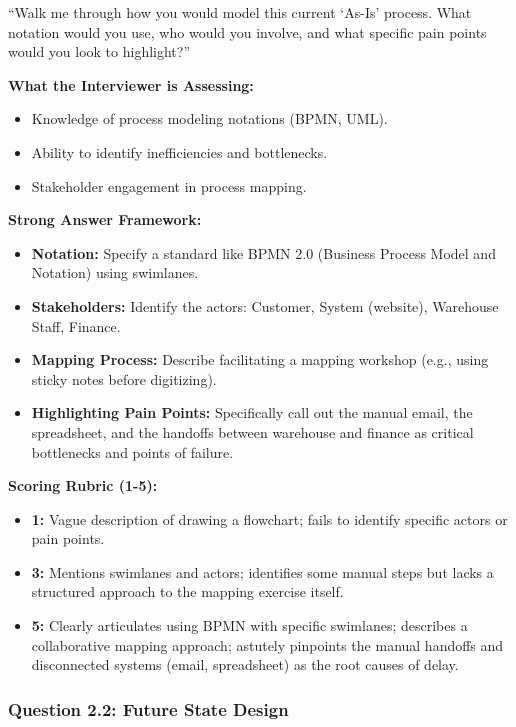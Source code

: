 ``Walk me through how you would model this current `As-Is' process. What
notation would you use, who would you involve, and what specific pain
points would you look to highlight?''

\textbf{What the Interviewer is Assessing:}

\begin{itemize}
\tightlist
\item
  Knowledge of process modeling notations (BPMN, UML).
\item
  Ability to identify inefficiencies and bottlenecks.
\item
  Stakeholder engagement in process mapping.
\end{itemize}

\textbf{Strong Answer Framework:}

\begin{itemize}
\tightlist
\item
  \textbf{Notation:} Specify a standard like BPMN 2.0 (Business Process
  Model and Notation) using swimlanes.
\item
  \textbf{Stakeholders:} Identify the actors: Customer, System
  (website), Warehouse Staff, Finance.
\item
  \textbf{Mapping Process:} Describe facilitating a mapping workshop
  (e.g., using sticky notes before digitizing).
\item
  \textbf{Highlighting Pain Points:} Specifically call out the manual
  email, the spreadsheet, and the handoffs between warehouse and finance
  as critical bottlenecks and points of failure.
\end{itemize}

\textbf{Scoring Rubric (1-5):}

\begin{itemize}
\tightlist
\item
  \textbf{1:} Vague description of drawing a flowchart; fails to
  identify specific actors or pain points.
\item
  \textbf{3:} Mentions swimlanes and actors; identifies some manual
  steps but lacks a structured approach to the mapping exercise itself.
\item
  \textbf{5:} Clearly articulates using BPMN with specific swimlanes;
  describes a collaborative mapping approach; astutely pinpoints the
  manual handoffs and disconnected systems (email, spreadsheet) as the
  root causes of delay.
\end{itemize}

\subsubsection{Question 2.2: Future State
Design}\label{question-2.2-future-state-design}

